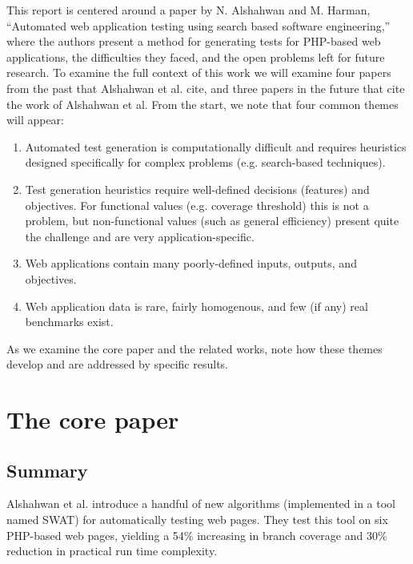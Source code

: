 \documentclass{sig-alternate-05-2015}
\begin{document}
This report is centered around a paper by N. Alshahwan and M. Harman, ``Automated web application testing using search based software engineering,'' where the authors present a method for generating tests for PHP-based web applications, the difficulties they faced, and the open problems left for future research. To examine the full context of this work we will examine four papers from the past that Alshahwan et al. cite, and three papers in the future that cite the work of Alshahwan et al. From the start, we note that four common themes will appear:

\begin{enumerate}
\item Automated test generation is computationally difficult and requires heuristics designed specifically for complex problems (e.g. search-based techniques).
\item Test generation heuristics require well-defined decisions (features) and objectives. For functional values (e.g. coverage threshold) this is not a problem, but non-functional values (such as general efficiency) present quite the challenge and are very application-specific. 
\item Web applications contain many poorly-defined inputs, outputs, and objectives. 
\item Web application data is rare, fairly homogenous, and few (if any) real benchmarks exist. 
\end{enumerate}

As we examine the core paper and the related works, note how these themes develop and are addressed by specific results.

\section{The core paper}

\subsection{Summary}

Alshahwan et al. \cite{alshahwan2011automated} introduce a handful of new algorithms (implemented in a tool named SWAT) for automatically testing web pages. They test this tool on six PHP-based web pages, yielding a 54\% increasing in branch coverage and 30\% reduction in practical run time complexity. 
\end{document}
